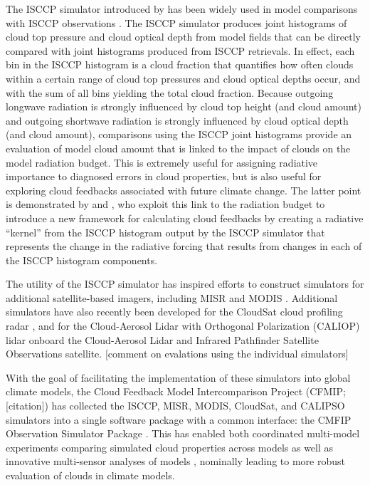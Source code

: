 The ISCCP simulator introduced by \citet{klein_and_jakob_1999} has been
widely used in model comparisons with ISCCP observations
\citep{webb_et_al_2001, norris_and_weaver_2001, lin_and_zhang_2004, zhang_et_al_2005, wyant_et_al_2006, klein_et_al_2013}.
The ISCCP simulator produces joint histograms of cloud top pressure and
cloud optical depth from model fields that can be directly compared with
joint histograms produced from ISCCP retrievals. In effect, each bin in
the ISCCP histogram is a cloud fraction that quantifies how often clouds
within a certain range of cloud top pressures and cloud optical depths
occur, and with the sum of all bins yielding the total cloud fraction.
Because outgoing longwave radiation is strongly influenced by cloud top
height (and cloud amount) and outgoing shortwave radiation is strongly
influenced by cloud optical depth (and cloud amount), comparisons using
the ISCCP joint histograms provide an evaluation of model cloud amount
that is linked to the impact of clouds on the model radiation budget.
This is extremely useful for assigning radiative importance to diagnosed
errors in cloud properties, but is also useful for exploring cloud
feedbacks associated with future climate change. The latter point is
demonstrated by \citet{zelinka_et_al_2012a} and
\citet{zelinka_et_al_2012b}, who exploit this link to the radiation
budget to introduce a new framework for calculating cloud feedbacks by
creating a radiative ``kernel'' from the ISCCP histogram output by the
ISCCP simulator that represents the change in the radiative forcing that
results from changes in each of the ISCCP histogram components.

The utility of the ISCCP simulator has inspired efforts to construct
simulators for additional satellite-based imagers, including MISR
\citep{marchand_and_ackerman_2010} and MODIS \citep{pincus_et_al_2012}.
Additional simulators have also recently been developed for the CloudSat
\citep{stephens_et_al_2002} cloud profiling radar
\citep[Quickbeam;][]{haynes_et_al_2007}, and for the Cloud-Aerosol Lidar
with Orthogonal Polarization (CALIOP) lidar \citep{chepfer_et_al_2008}
onboard the Cloud-Aerosol Lidar and Infrared Pathfinder Satellite
Observations \citep[CALIPSO][]{winker_et_al_2007} satellite. {[}comment
on evalations using the individual simulators{]}

With the goal of facilitating the implementation of these simulators
into global climate models, the Cloud Feedback Model Intercomparison
Project (CFMIP; {[}citation{]}) has collected the ISCCP, MISR, MODIS,
CloudSat, and CALIPSO simulators into a single software package with a
common interface: the CMFIP Observation Simulator Package
\citep[COSP;][]{bodas-salcedo_et_al_2011}. This has enabled both
coordinated multi-model experiments comparing simulated cloud properties
across models as well as innovative multi-sensor analyses of models
\citep[e.g.,][]{bodas-salcedo_et_al_2011, kay_et_al_2012, klein_et_al_2013},
nominally leading to more robust evaluation of clouds in climate models.

